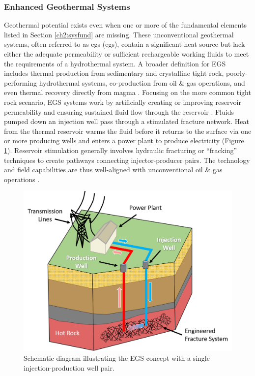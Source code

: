 \subsubsection{Enhanced Geothermal Systems}\label{ch2:egs}
Geothermal potential exists even when one or more of the fundamental elements listed in Section \ref{ch2:sysfund} are missing. These unconventional geothermal systems, often referred to as \acrlong{egs} (\acrshort{egs}), contain a significant heat source but lack either the adequate permeability or sufficient rechargeable working fluids to meet the requirements of a hydrothermal system. A broader definition for EGS includes thermal production from sedimentary and crystalline tight rock, poorly-performing hydrothermal systems, co-production from oil \& gas operations, and even thermal recovery directly from magma \citep{tester_future_2006}. Focusing on the more common tight rock scenario, EGS systems work by artificially creating or improving reservoir permeability and ensuring sustained fluid flow through the reservoir \citep[p.\ 281]{glassley_geothermal_2015}. Fluids pumped down an injection well pass through a stimulated fracture network. Heat from the thermal reservoir warms the fluid before it returns to the surface via one or more producing wells and enters a power plant to produce electricity (Figure \ref{fig:egs_schematic}). Reservoir stimulation generally involves hydraulic fracturing or ``fracking” techniques to create pathways connecting injector-producer pairs. The technology and field capabilities are thus well-aligned with unconventional oil \& gas operations \citep{petty_synergies_2009}. 

\begin{figure}%
\centering
\includegraphics[width=.85\textwidth]{templates/images/Figure-EGS_Schematic.png}
\caption[Enhanced Geothermal Systems schematic]{Schematic diagram illustrating the EGS concept with a single injection-production well pair.}
\label{fig:egs_schematic}
\end{figure}

